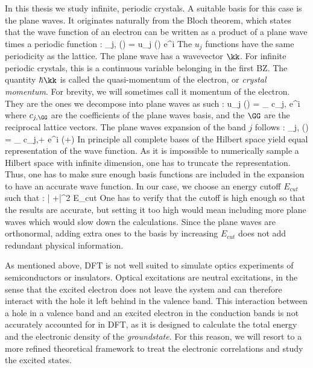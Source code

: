 In this thesis we study infinite, periodic crystals. A suitable basis for this case is the plane waves. It originates naturally from the Bloch theorem, which states that the wave function of an electron can be written as a product of a plane wave times a periodic function :
\be
 	\phi_{j,\kk} (\rr) = u_j (\rr) e^{i\kk\cdot\rr}
\ee
The $u_j$ functions have the same periodicity as the lattice. The plane wave has a wavevector $\kk$. For infinite periodic crystals, this is a continuous variable belonging in the first \gls{BZ}. The quantity $\hbar \kk$ is called the quasi-momentum of the electron, or \textit{crystal momentum}. For brevity, we will sometimes call it momentum of the electron.
They are the ones we decompose into plane waves as such :
\be
 	u_j (\rr) = \sum_{\GG} c_{j,\GG} e^{i\GG \cdot \rr}
\ee
where $c_{j,\GG}$ are the coefficients of the plane waves basis, and the $\GG$ are the reciprocal lattice vectors. The plane waves expansion of the band $j$ follows :
\be
	\phi_{j,\kk} (\rr) = \sum_{\GG} c_{j,\kk+\GG} e^{i (\kk+\GG)\cdot \rr}
\ee
In principle all complete bases of the Hilbert space yield equal representation of the wave function. As it is impossible to numerically sample a Hilbert space with infinite dimension, one has to truncate the representation. Thus, one has to make sure enough basis functions are included in the expansion to have an accurate wave function. In our case, we choose an energy cutoff $E_{cut}$ such that :
\be
	 \left| \kk+\GG \right|^2 \leq E_{cut}
\ee
One has to verify that the cutoff is high enough so that the results are accurate, but setting it too high would mean including more plane waves which would slow down the calculations. Since the plane waves are orthonormal, adding extra ones to the basis by increasing $E_{cut}$ does not add redundant physical information.

As mentioned above, \gls{DFT} is not well suited to simulate optics experiments of semiconductors or insulators. Optical excitations are neutral excitations, in the sense that the excited electron does not leave the system and can therefore interact with the hole it left behind in the valence band. This interaction between a hole in a valence band and an excited electron in the conduction bands is not accurately accounted for in \gls{DFT}, as it is designed to calculate the total energy and the electronic density of the \textit{groundstate}. For this reason, we will resort to a more refined theoretical framework to treat the electronic correlations and study the excited states.


